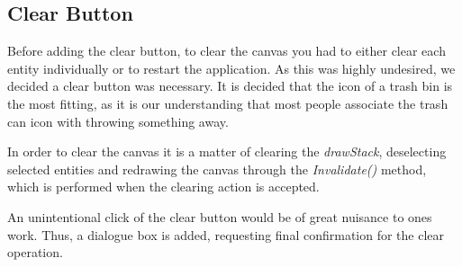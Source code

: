 \subsection{Clear Button}
Before adding the clear button, to clear the canvas you had to either clear each entity individually or to restart the application. 
As this was highly undesired, we decided a clear button was necessary.
It is decided that the icon of a trash bin is the most fitting, as it is our understanding that most people associate the trash can icon with throwing something away.

In order to clear the canvas it is a matter of clearing the \textit{drawStack}, deselecting selected entities and redrawing the canvas through the \textit{Invalidate()} method, which is performed when the clearing action is accepted.

An unintentional click of the clear button would be of great nuisance to ones work. 
Thus, a dialogue box is added, requesting final confirmation for the clear operation.


